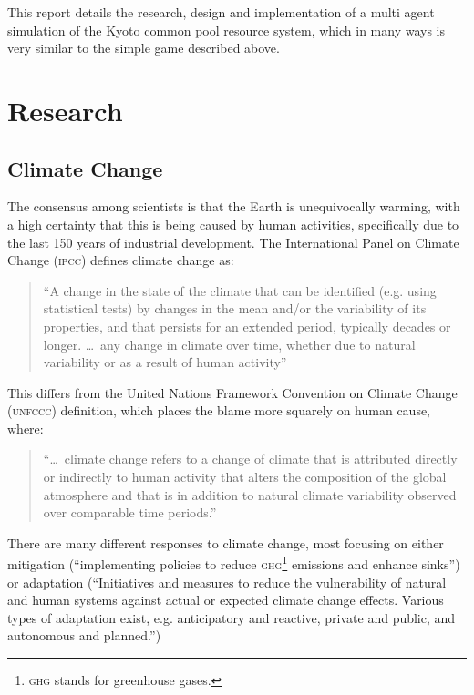 \documentclass[]{article} %
\begin{document}
This report details the research, design and implementation of a multi agent simulation of the Kyoto common pool resource system, which in many ways is very similar to the simple game described above.

\section{Research}
\subsection{Climate Change}
The consensus among scientists is that the Earth is unequivocally warming, with a high certainty that this is being caused by human activities, specifically due to the last 150 years of industrial development. The International Panel on Climate Change (\textsc{ipcc}) defines climate change as:

\begin{quote}
``A change in the state of the climate that can be identified (e.g. using statistical tests) by changes in the mean and/or the variability of its properties, and that persists for an extended period, typically decades or longer. \ldots~any change in climate over time, whether due to natural variability or as a result of human activity''~\cite{IPCC-synthesis-07}
\end{quote}

This differs from the United Nations Framework Convention on Climate Change (\textsc{unfccc}) definition, which places the blame more squarely on human cause, where:

\begin{quote}
``\ldots~climate change refers to a change of climate that is attributed directly or indirectly to human activity that alters the composition of the global atmosphere and that is in addition to natural climate variability observed over comparable time periods.''~\cite{IPCC-synthesis-07}
\end{quote}

There are many different responses to climate change, most focusing on either mitigation (``implementing policies to reduce \textsc{ghg}\footnote{\textsc{ghg} stands for greenhouse gases.} emissions and enhance sinks'')~\cite{IPCC-glossary-mitigation} or adaptation (``Initiatives and measures to reduce the vulnerability of natural and human systems against actual or expected climate change effects. Various types of adaptation exist, e.g. anticipatory and reactive, private and public, and autonomous and planned.'')~\cite{IPCC-glossary-adaptation}
\end{document}
